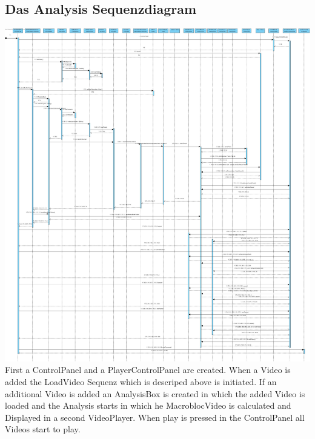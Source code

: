 \documentclass[twoside]{book}
\newcommand{\+}{\discretionary{\mbox{\scriptsize$\hookleftarrow$}}{}{}}
\begin{document}
\subsection*{Das Analysis Sequenzdiagram}
{\centering\includegraphics[width=1\textwidth]{SequenceDiagram2.jpg}}\\
First a ControlPanel and a PlayerControlPanel are created. When a Video is added the LoadVideo Sequenz which is descriped above is initiated.  If an additional Video is added  
an AnalysisBox is created in which the added Video is loaded and the Analysis starts in which he MacroblocVideo is calculated and Displayed in a second VideoPlayer.
When play is pressed in the ControlPanel all Videos start to play.
\newpage
\end{document}
